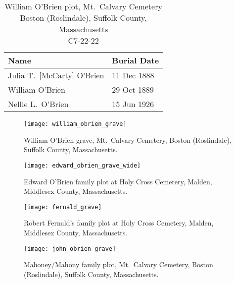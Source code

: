 \begin{table}[ht]
	\centering
	\caption{William O'Brien plot, Mt.\ Calvary Cemetery\cite{William3OBrienBurial} \\
		Boston (Roslindale), Suffolk County, Massachusetts\\
		C7-22-22}
	\begin{tabular}{|l|l|}
		\hline
		\textbf{Name} & \textbf{Burial Date} \\
		\hline
		Julia T.\ [McCarty] O'Brien\index{McCarty!Julia T.}\index{O'Brien!Julia T.\ (McCarty)} & 11 Dec 1888 \\
		\hline
		William O'Brien\index{O'Brien!William\textsuperscript{3}} & 29 Oct 1889 \\
		\hline
		Nellie L.\ O'Brien\index{O'Brien!Ellen/Nellie Louise\textsuperscript{4}} & 15 Jun 1926 \\
		\hline
	\end{tabular}
\end{table}

\clearpage

\begin{figure}[p]
	\centering
	\texttt{[image: william\_obrien\_grave]}
	\caption{William O'Brien grave, Mt.\ Calvary Cemetery, Boston (Roslindale), Suffolk County, Massachusetts.}
	\label{fig:WilliamOBrienGrave}
\end{figure}

\begin{figure}[p]
	\centering
	\texttt{[image: edward\_obrien\_grave\_wide]}
	\caption{Edward O'Brien family plot at Holy Cross Cemetery, Malden, Middlesex County, Massachusetts.}
	\label{fig:EdwardOBrienGrave}
\end{figure}

\begin{figure}[p]
	\centering
	\texttt{[image: fernald\_grave]}
	\caption{Robert Fernald's family plot at Holy Cross Cemetery, Malden, Middlesex County, Massachusetts.}
	\label{fig:FernaldGrave}
\end{figure}

\begin{figure}[p]
	\centering
	\texttt{[image: john\_obrien\_grave]}
	\caption{Mahoney/Mahony family plot, Mt.\ Calvary Cemetery, Boston (Roslindale), Suffolk County, Massachusetts.}
	\label{fig:MahoneyPlot}
\end{figure}

